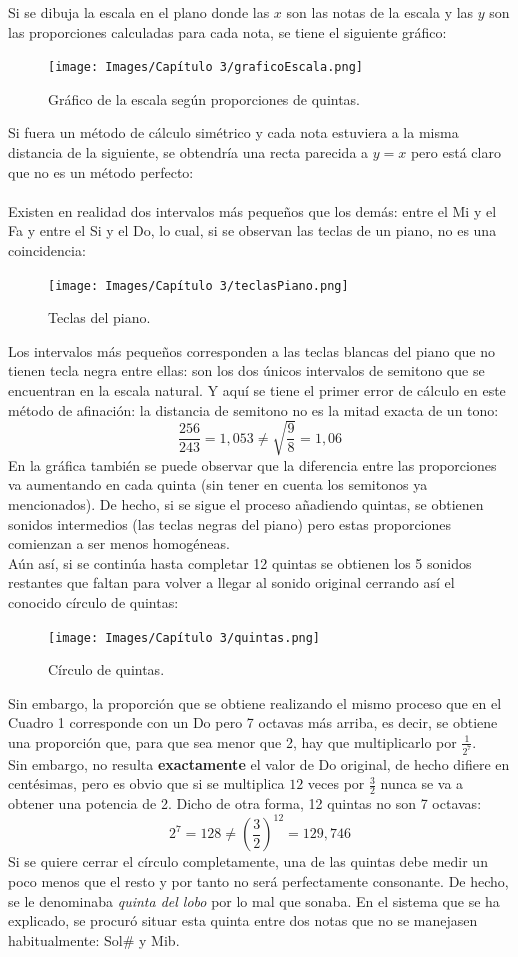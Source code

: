 \documentclass[a4paper, openright, 11pt, titlepage]{report}
\theoremstyle{definition}\newtheorem{defin}[propo]{Definition}
\theoremstyle{definition}\newtheorem{obser}[propo]{Remark}
\theoremstyle{definition}\newtheorem{ejem}[propo]{Ejemplo}
\theoremstyle{definition}\newtheorem{algoritmo}[propo]{Algoritmo}
\begin{document}
Si se dibuja la escala en el plano donde las $x$ son las notas de la escala y las $y$ son las proporciones calculadas para cada nota, se tiene el siguiente gráfico:
\begin{figure}[H]
    \centering
    \texttt{[image: Images/Capítulo 3/graficoEscala.png]}
    \caption{Gráfico de la escala según proporciones de quintas.}
\end{figure}
Si fuera un método de cálculo simétrico y cada nota estuviera a la misma distancia de la siguiente, se obtendría una recta parecida a $y = x$ pero está claro que no es un método perfecto:\\\\
Existen en realidad dos intervalos más pequeños que los demás: entre el Mi y el Fa y entre el Si y el Do, lo cual, si se observan las teclas de un piano, no es una coincidencia:
\begin{figure}[H]
    \centering
    \texttt{[image: Images/Capítulo 3/teclasPiano.png]}
    \caption{Teclas del piano.}
\end{figure}
Los intervalos más pequeños corresponden a las teclas blancas del piano que no tienen tecla negra entre ellas: son los dos únicos intervalos de semitono que se encuentran en la escala natural. Y aquí se tiene el primer error de cálculo en este método de afinación: la distancia de semitono no es la mitad exacta de un tono: $$\frac{256}{243} = 1,053 \not= \sqrt{\frac{9}{8}} = 1,06$$
En la gráfica también se puede observar que la diferencia entre las proporciones va aumentando en cada quinta (sin tener en cuenta los semitonos ya mencionados). De hecho, si se sigue el proceso añadiendo quintas, se obtienen sonidos intermedios (las teclas negras del piano) pero estas proporciones comienzan a ser menos homogéneas.\\
Aún así, si se continúa hasta completar 12 quintas se obtienen los 5 sonidos restantes que faltan para volver a llegar al sonido original cerrando así el conocido círculo de quintas:
\begin{figure}[H]
    \centering
    \texttt{[image: Images/Capítulo 3/quintas.png]}
    \caption{Círculo de quintas.}
\end{figure}
Sin embargo, la proporción que se obtiene realizando el mismo proceso que en el Cuadro 1 corresponde con un Do pero 7 octavas más arriba, es decir, se obtiene una proporción que, para que sea menor que 2, hay que multiplicarlo por $\frac{1}{2^{7}}$.\\
Sin embargo, no resulta \textbf{exactamente} el valor de Do original, de hecho difiere en centésimas, pero es obvio que si se multiplica $12$ veces por $\frac{3}{2}$ nunca se va a obtener una potencia de 2. Dicho de otra forma, 12 quintas no son 7 octavas: $$2^{7} = 128 \not= (\frac{3}{2})^{12} = 129,746$$
Si se quiere cerrar el círculo completamente, una de las quintas debe medir un poco menos que el resto y por tanto no será perfectamente consonante. De hecho, se le denominaba \textit{quinta del lobo} por lo mal que sonaba. En el sistema que se ha explicado, se procuró situar esta quinta entre dos notas que no se manejasen habitualmente: Sol# y Mib. 
\end{document}
